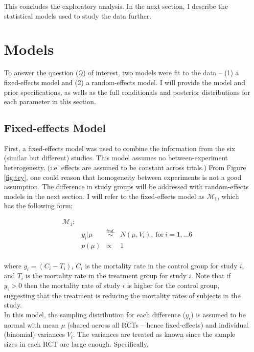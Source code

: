 \documentclass{../../tex_template/asaproc}
\newcommand{\M}{\mathcal{M}}
\newcommand{\Q}{\mathbb{Q}}
\newcommand{\simi}{\overset{ind.}{\sim}}
\begin{document}
This concludes the exploratory analysis. In the next section, I describe the
statistical models used to study the data further.\\

\section{Models} 
To answer the question ($\Q$) of interest, two models were fit to the data --
(1) a fixed-effects model and (2) a random-effects model. I will provide the
model and prior specifications, as wells as the full conditionals and posterior
distributions for each parameter in this section.\\

\subsection{Fixed-effects Model}
First, a fixed-effects model was used to combine the information from the six
(similar but different) studies. This model assumes no between-experiment
heterogeneity. (i.e. effects are assumed to be constant across trials.) From
Figure \ref{fig:tcy}, one could reason that homogeneity between experiments is not
a good assumption.  The difference in study groups will be addressed with
random-effects models in the next section. I will refer to the fixed-effects
model as $\M_1$, which has the following form:

$$
\begin{array}{lrcl}
  \M_1: \\
  & y_i | \mu &\simi& N(\mu,V_i),~\text{for$~i = 1,...6$}\\
  & p(\mu) &\propto& 1\\
\end{array}
$$

where $y_i = (C_i - T_i)$, $C_i$ is the mortality rate in the control group for
study $i$, and $T_i$ is the mortality rate in the treatment group for study
$i$. Note that if $y_i > 0$ then the mortality rate of study $i$ is higher
for the control group, suggesting that the treatment is reducing the
mortality rates of subjects in the study.\\

In this model, the sampling distribution for each difference ($y_i$) is assumed
to be normal with mean $\mu$ (shared across all RCTs -- hence fixed-effects)
and individual (binomial) variances $V_i$. The variances are treated as known
since the sample sizes in each RCT are large enough. Specifically,
\end{document}
